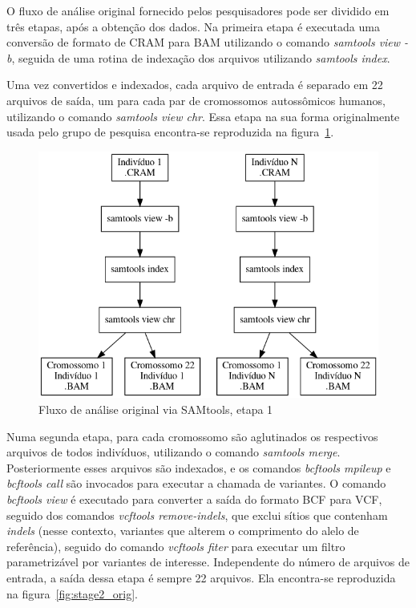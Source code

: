\documentclass[cic,tc]{iiufrgs}
\begin{document}
O fluxo de análise original fornecido pelos pesquisadores pode ser dividido em
três etapas, após a obtenção dos dados. Na primeira etapa é executada uma
conversão de formato de CRAM para BAM utilizando o comando \textit{samtools
view -b}, seguida de uma rotina de indexação dos arquivos utilizando
\textit{samtools index}.

Uma vez convertidos e indexados, cada arquivo de entrada é separado em 22
arquivos de saída, um para cada par de cromossomos autossômicos humanos,
utilizando o comando \textit{samtools view chr}. Essa etapa na sua forma
originalmente usada pelo grupo de pesquisa encontra-se reproduzida na
figura~\ref{fig:stage1_orig}.

\begin{figure}
  \caption{Fluxo de análise original via SAMtools, etapa 1}
    \begin{center}
      \includegraphics[width=0.85\linewidth]{img/stage1_orig.png}
    \end{center}
    \label{fig:stage1_orig}
\end{figure}

Numa segunda etapa, para cada cromossomo são aglutinados os respectivos
arquivos de todos indivíduos, utilizando o comando \textit{samtools merge}.
Posteriormente esses arquivos são indexados, e os comandos \textit{bcftools
mpileup} e \textit{bcftools call} são invocados para executar a chamada de
variantes. O comando \textit{bcftools view} é executado para converter a saída
do formato BCF para VCF, seguido dos comandos \textit{vcftools remove-indels},
que exclui sítios que contenham \textit{indels} (nesse contexto, variantes que
alterem o comprimento do alelo de referência), seguido do comando
\textit{vcftools fiter} para executar um filtro parametrizável por variantes de
interesse. Independente do número de arquivos de entrada, a saída dessa etapa é
sempre 22 arquivos. Ela encontra-se reproduzida na
figura~\ref{fig:stage2_orig}.
\end{document}
